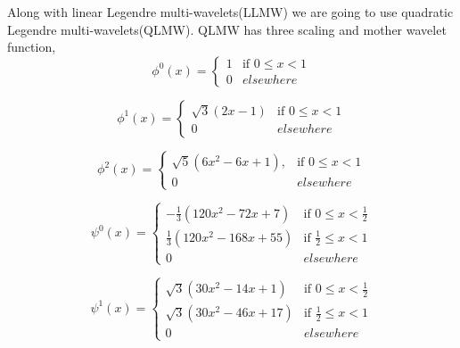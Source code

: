 
Along with linear Legendre multi-wavelets(LLMW) we are going to use quadratic Legendre multi-wavelets(QLMW). QLMW has three scaling and mother wavelet function, 
\begin{equation}\label{eq:qlmwphi0}
\phi^0(x)=
\left\{
    \begin{array}{ll}
        1  & \mbox{if } 0 \leq x < 1 \\
        0 & elsewhere
    \end{array}
\right.
\end{equation}

\begin{equation}\label{eq:qlmwphi1}
\phi^1(x)=
\left\{
    \begin{array}{ll}
        \sqrt{3}(2x-1)  & \mbox{if } 0 \leq x < 1 \\
        0 & elsewhere
    \end{array}
\right.
\end{equation}

\begin{equation}\label{eq:qlmwphi2}
\phi^2(x)=
\left\{
    \begin{array}{ll}
        \sqrt{5}(6x^2-6x+1),  & \mbox{if } 0 \leq x < 1 \\
        0 & elsewhere
    \end{array}
\right.
\end{equation}

\begin{equation}
\psi^0(x)=
\left\{
    \begin{array}{ll}
        -\frac{1}{3}(120x^2-72x+7)  & \mbox{if } 0 \leq x < \frac{1}{2} \\
        \frac{1}{3}(120x^2-168x+55)  & \mbox{if } \frac{1}{2} \leq x < 1 \\
        0 & elsewhere
    \end{array}
\right.
\end{equation}

\begin{equation}
\psi^1(x)=
\left\{
    \begin{array}{ll}
        \sqrt{3}(30x^2-14x+1)  & \mbox{if } 0 \leq x < \frac{1}{2} \\
        \sqrt{3}(30x^2-46x+17)  & \mbox{if } \frac{1}{2} \leq x < 1 \\
        0 & elsewhere
    \end{array}
\right.
\end{equation}

